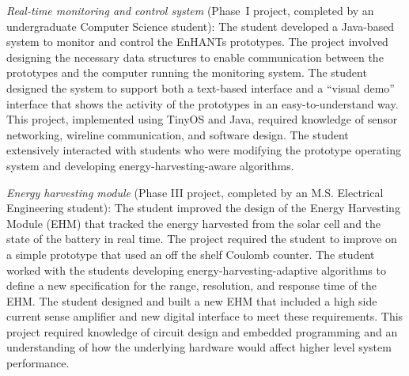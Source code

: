\documentclass[journal,twopages]{IEEEtran}
\newenvironment{myitemize}{\begin{list}{}{\renewcommand{\leftmargin}{0.2in}}}{\end{list}}
\begin{document}
\begin{myitemize}



\iffalse
\item \emph{Organic Solar Cell Fabrication} (Phase IV project, completed by an M.S. Electrical Engineering student):
In this project a student design and fabricated custom organic solar cells to replace the commercial amorphous silicon solar cells used in the previous phase. The organic solar cells were designed to have an open circuit voltage and short circuit current similar to the previous solar cells. The fabrication process required many iterations to ensure reliability and repeatability. The student also worked closely with the students working on the testbed to ensure proper integration. Mechanical enclosures were built to increase the robustness of the organic solar cells and specialized handling techniques were taught to students working on the testbed. Integration issues, such as physical connections between components and the overall robustness and aesthetics of the system, are often overlooked.
\fi

\item \emph{Real-time monitoring and control system} (Phase~I project, completed by an undergraduate Computer Science student):
The student developed a \mbox{Java-based} system to monitor and control the EnHANTs prototypes. The project involved designing the necessary data structures to enable communication between the prototypes and the computer running the monitoring system. The student designed the system to support both a text-based interface and a ``visual demo'' interface that shows the activity of the prototypes in an easy-to-understand way. This project, implemented using TinyOS and Java, required knowledge of sensor networking, wireline communication, and software design. The student extensively interacted with students who were modifying the prototype operating system and developing energy-harvesting-aware algorithms.

\item \emph{Energy harvesting module} (Phase III project, completed by an M.S. Electrical Engineering student): The student improved the design of the Energy Harvesting Module (EHM) that tracked the energy harvested from the solar cell and the state of the battery in real time. The project required the student to improve on a simple prototype that used an off the shelf Coulomb counter. The student worked with the students developing energy-harvesting-adaptive algorithms to define a new specification for the range, resolution, and response time of the EHM. The student designed and built a new EHM that included a high side current sense amplifier and new digital interface to meet these requirements. This project required knowledge of circuit design and embedded programming and an understanding of how the underlying hardware would affect higher level system performance.



\end{myitemize}
\end{document}

